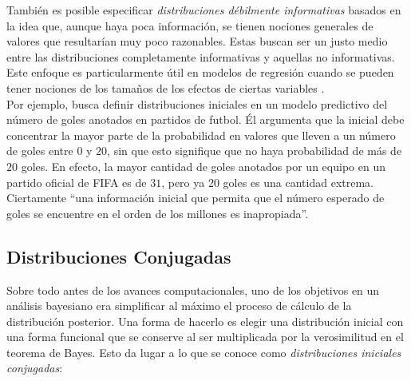 También es posible especificar \textit{distribuciones débilmente informativas} basados en la idea que, aunque haya poca información, se tienen nociones generales de valores que resultarían muy poco razonables. Estas buscan ser un justo medio entre las distribuciones completamente informativas y aquellas no informativas. Este enfoque es particularmente útil en modelos de regresión cuando se pueden tener nociones de los tamaños de los efectos de ciertas variables \parencite{Gelman13}.\\ 

Por ejemplo, \textcite{Regueiro12} busca definir distribuciones iniciales en un modelo predictivo del número de goles anotados en partidos de futbol. Él argumenta que la inicial debe concentrar la mayor parte de la probabilidad en valores que lleven a un número de goles entre $0$ y $20$, sin que esto signifique que no haya probabilidad de más de $20$ goles. En efecto, la mayor cantidad de goles anotados por un equipo en un partido oficial de FIFA es de $31$, pero ya $20$ goles es una cantidad extrema. Ciertamente ``una información inicial que permita que el número esperado de goles se encuentre en el orden de los millones es inapropiada''. 

\subsection{Distribuciones Conjugadas}

Sobre todo antes de los avances computacionales, uno de los objetivos en un análisis bayesiano era simplificar al máximo el proceso de cálculo de la distribución posterior. Una forma de hacerlo es elegir una distribución inicial con una forma funcional que se conserve al ser multiplicada por la verosimilitud en el teorema de Bayes. Esto da lugar a lo que se conoce como \textit{distribuciones iniciales conjugadas}: 

